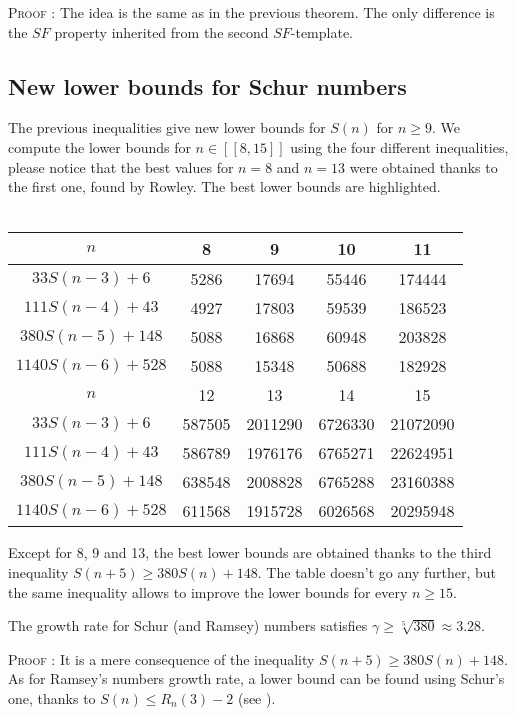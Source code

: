 \textsc{Proof :} The idea is the same as in the previous theorem. The only difference is the \(SF\) property inherited 
from the second \(SF\)-template.



\subsection{New lower bounds for Schur numbers}

The previous inequalities give new lower bounds for \(S(n)\) for
\( n \geqslant 9 \). We compute the lower
bounds for \( n \in [\![8,15]\!] \) using the four different inequalities, please notice that the best values for \( n
=8\) and \(n = 13\) were obtained thanks to the first one, found by Rowley. The best lower bounds are highlighted.\\
\\
\begin{center}
\begin{tabular}{|*{5}{c|}}
    \hline
	\(n\) & 8 & 9 & 10 & 11 \\
	\hline
	\(33S(n-3) + 6 \) & \cellcolor{yellow} 5286 & 17694 & 55446 & 174444\\
	\hline
	\(111S(n-4) + 43 \) & 4927 & \cellcolor{yellow} 17803 & 59539 & 186523\\
	\hline
	\(380S(n-5) + 148 \) & 5088 & 16868 & \cellcolor{yellow} 60948 & \cellcolor{yellow} 203828 \\
	\hline
	\(1140S(n-6) + 528 \) & 5088 & 15348 & 50688 & 182928\\
	\hline
	\hline
	\(n\) & 12 & 13 & 14 & 15 \\
	\hline
	\(33S(n-3) + 6 \) & 587505 & \cellcolor{yellow} 2011290 & 6726330 & 21072090\\
	\hline
	\(111S(n-4) + 43 \) & 586789 & 1976176 & 6765271 & 22624951 \\
	\hline
\(380S(n-5) + 148 \) & \cellcolor{yellow} 638548 & 2008828 & \cellcolor{yellow} 6765288 & \cellcolor{yellow} 23160388 \\\hline
	\(1140S(n-6) + 528 \) & 611568 & 1915728 & 6026568 & 20295948 \\
	\hline
\end{tabular}
\end{center}
Except for 8, 9 and 13, the best lower bounds are obtained thanks to
the third inequality \( S(n+5) \geqslant 380S(n) + 148\). The table
doesn't go any further, but the same inequality allows to improve the
lower bounds for every \( n \geqslant 15 \).

\begin{corollary}
The growth rate for Schur (and Ramsey) numbers satisfies \(\gamma \geqslant \sqrt[5]{380} \approx 3.28 \).
\end{corollary}
\textsc{Proof :} It is a mere consequence of the inequality \( S(n+5) \geqslant 380S(n) + 148\). As for Ramsey's
numbers growth rate, a lower bound can be found using Schur's one, thanks to \(S(n) \leqslant R_n(3)-2 \)
(see \cite{Schur1917}).
